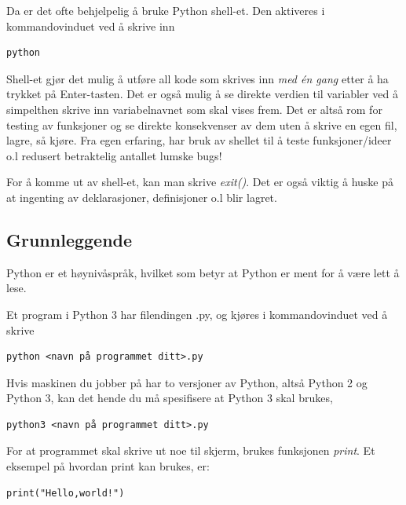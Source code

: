 \documentclass[%
oneside,                 %
final,                   %
10pt]{article}
\begin{document}
Da er det ofte behjelpelig å bruke Python shell-et. Den aktiveres i kommandovinduet ved å skrive inn
\begin{verbatim}
python
\end{verbatim}

Shell-et gjør det mulig å utføre all kode som skrives inn \emph{med én gang} etter å ha trykket på Enter-tasten. Det er også mulig å se direkte verdien til variabler ved å simpelthen skrive inn variabelnavnet som skal vises frem.
Det er altså rom for testing av funksjoner og se direkte konsekvenser av dem uten å skrive en egen fil, lagre, så kjøre. Fra egen erfaring, har bruk av shellet til å teste funksjoner/ideer o.l redusert betraktelig antallet lumske bugs!

For å komme ut av shell-et, kan man skrive \emph{exit()}. Det er også viktig å huske på at ingenting av deklarasjoner, definisjoner o.l blir lagret.

\subsection{Grunnleggende}
Python er et høynivåspråk, hvilket som betyr at Python er ment for å være lett å lese.

Et program i Python 3 har filendingen .py, og kjøres i kommandovinduet ved å skrive
\begin{verbatim}
python <navn på programmet ditt>.py
\end{verbatim}
Hvis maskinen du jobber på har to versjoner av Python, altså Python 2 og Python 3, kan det hende du må spesifisere at Python 3 skal brukes,
\begin{verbatim}
python3 <navn på programmet ditt>.py
\end{verbatim}

For at programmet skal skrive ut noe til skjerm, brukes funksjonen \emph{print}.
Et eksempel på hvordan print kan brukes, er:

\begin{verbatim}
print("Hello,world!")
\end{verbatim}
\end{document}
